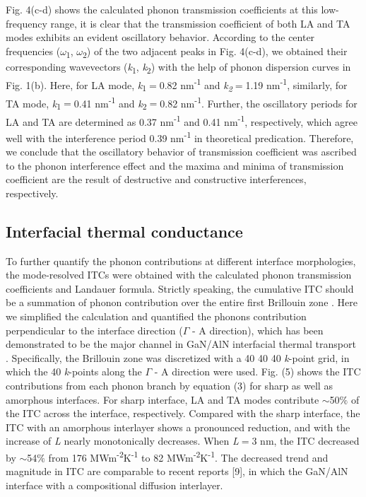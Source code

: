 \documentclass{article}
\begin{document}
Fig. 4(c-d) shows the calculated phonon transmission coefficients at this low-frequency range, it is clear that the transmission coefficient of both LA and TA modes exhibits an evident oscillatory behavior. According to the center frequencies (\textit{$\omega$}\textsubscript{1},\textit{ $\omega$}\textsubscript{2}) of the two adjacent peaks in Fig. 4(c-d), we obtained their corresponding wavevectors (\textit{k}\textsubscript{1}, \textit{k}\textsubscript{2}) with the help of phonon dispersion curves in Fig. 1(b). Here, for LA mode, \textit{k}\textsubscript{1}$=$0.82 nm\textsuperscript{-1} and \textit{k\textsubscript{2}}$=$1.19 nm\textsuperscript{-1}, similarly, for TA mode, \textit{k}\textsubscript{1}$=$0.41 nm\textsuperscript{-1 }and \textit{k}\textsubscript{2}$=$0.82 nm\textsuperscript{-1}. Further, the oscillatory periods for LA and TA are determined as 0.37 nm\textsuperscript{-1} and 0.41 nm\textsuperscript{-1}, respectively, which agree well with the interference period 0.39 nm\textsuperscript{-1 }in theoretical predication. Therefore, we conclude that the oscillatory behavior of transmission coefficient was ascribed to the phonon interference effect and the maxima and minima of transmission coefficient are the result of destructive and constructive interferences, respectively. 

\subsection{Interfacial thermal conductance}

To further quantify the phonon contributions at different interface morphologies, the mode-resolved ITCs were obtained with the calculated phonon transmission coefficients and Landauer formula. Strictly speaking, the cumulative ITC should be a summation of phonon contribution over the entire first Brillouin zone  \cite{gordiz2017phonon} \cite{wei2019phonon}. Here we simplified the calculation and quantified the phonons contribution perpendicular to the interface direction ($\Gamma$ - A direction), which has been demonstrated to be the major channel in GaN/AlN interfacial thermal transport  \cite{wang2007atomistic} \cite{ju2016anisotropic}. Specifically,  the Brillouin zone was discretized with a 40  40  40 \textit{k}-point grid, in which the 40 \textit{k}-points along the $\Gamma$ - A direction were used. Fig. (5) shows the ITC contributions from each phonon branch by equation (3) for sharp as well as amorphous interfaces. For sharp interface, LA and TA modes contribute $\sim$50$\%$ of the ITC across the interface, respectively. Compared with the sharp interface, the ITC with an amorphous interlayer shows a pronounced reduction, and with the increase of \textit{L} nearly monotonically decreases. When \textit{L}$=$3 nm, the ITC decreased by $\sim$54$\%$ from 176 MWm\textsuperscript{-2}K\textsuperscript{-1} to 82 MWm\textsuperscript{-2}K\textsuperscript{-1}. The decreased trend and magnitude in ITC are comparable to recent reports [9], in which the GaN/AlN interface with a compositional diffusion interlayer.   
\end{document}
